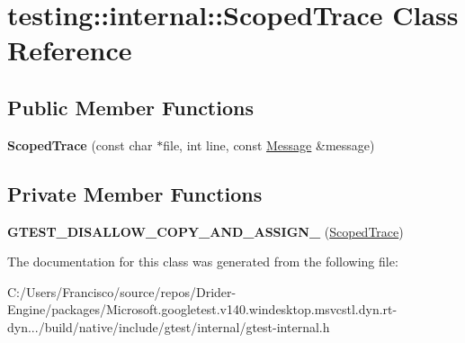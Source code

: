 \hypertarget{classtesting_1_1internal_1_1_scoped_trace}{}\section{testing\+:\+:internal\+:\+:Scoped\+Trace Class Reference}
\label{classtesting_1_1internal_1_1_scoped_trace}
\subsection*{Public Member Functions}
\begin{DoxyCompactItemize}
\item 
\mbox{\label{classtesting_1_1internal_1_1_scoped_trace_ab965d7010bbbc82c1bef6ebf8748bede}} 
{\bfseries Scoped\+Trace} (const char $\ast$file, int line, const \hyperlink{classtesting_1_1_message}{Message} \&message)
\end{DoxyCompactItemize}
\subsection*{Private Member Functions}
\begin{DoxyCompactItemize}
\item 
\mbox{\label{classtesting_1_1internal_1_1_scoped_trace_a0c896625ebd31d5cf7a2e7038df1c2b5}} 
{\bfseries G\+T\+E\+S\+T\+\_\+\+D\+I\+S\+A\+L\+L\+O\+W\+\_\+\+C\+O\+P\+Y\+\_\+\+A\+N\+D\+\_\+\+A\+S\+S\+I\+G\+N\+\_\+} (\hyperlink{classtesting_1_1internal_1_1_scoped_trace}{Scoped\+Trace})
\end{DoxyCompactItemize}


The documentation for this class was generated from the following file\+:\begin{DoxyCompactItemize}
\item 
C\+:/\+Users/\+Francisco/source/repos/\+Drider-\/\+Engine/packages/\+Microsoft.\+googletest.\+v140.\+windesktop.\+msvcstl.\+dyn.\+rt-\/dyn.../build/native/include/gtest/internal/gtest-\/internal.\+h\end{DoxyCompactItemize}
